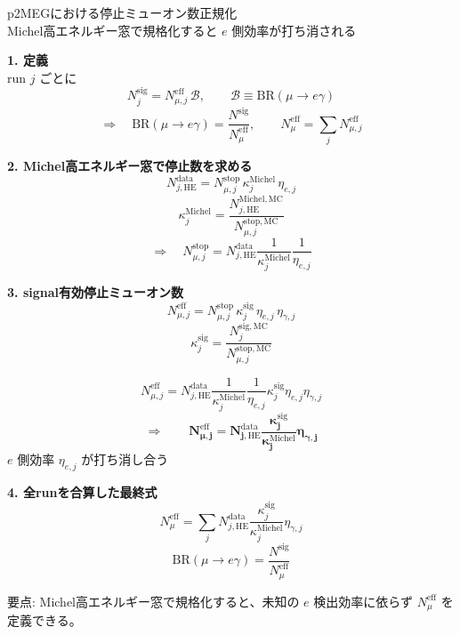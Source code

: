 \documentclass[uplatex,dvipdfmx,12pt]{jsarticle}
\begin{document}
\begin{center}
{\LARGE p2MEGにおける停止ミューオン数正規化}\\[2mm]
{\large Michel高エネルギー窓で規格化すると $e$ 側効率が打ち消される}
\end{center}

\vspace{2mm}

\begin{minipage}[t]{0.47\linewidth}
\large
\textbf{1. 定義}\\[1mm]
run $j$ ごとに
\[
N^{\mathrm{sig}}_j = N^{\mathrm{eff}}_{\mu,j}\,\mathcal{B},
\qquad
\mathcal{B}\equiv \mathrm{BR}(\mu\to e\gamma)
\]
\[
\Rightarrow\quad
\mathrm{BR}(\mu\to e\gamma)=\frac{N^{\mathrm{sig}}}{N^{\mathrm{eff}}_\mu},
\qquad
N^{\mathrm{eff}}_\mu=\sum_j N^{\mathrm{eff}}_{\mu,j}
\]

\vspace{2mm}
\textbf{2. Michel高エネルギー窓で停止数を求める}\\[1mm]
\[
N^{\mathrm{data}}_{j,\mathrm{HE}}
=
N^{\mathrm{stop}}_{\mu,j}\,
\kappa^{\mathrm{Michel}}_j\,
\eta_{e,j}
\]
\[
\kappa^{\mathrm{Michel}}_j
=
\frac{N^{\mathrm{Michel,MC}}_{j,\mathrm{HE}}}{N^{\mathrm{stop,MC}}_{\mu,j}}
\]
\[
\Rightarrow\quad
N^{\mathrm{stop}}_{\mu,j}
=
N^{\mathrm{data}}_{j,\mathrm{HE}}
\frac{1}{\kappa^{\mathrm{Michel}}_j}
\frac{1}{\eta_{e,j}}
\]
\end{minipage}
\hfill
\begin{minipage}[t]{0.49\linewidth}
\large
\textbf{3. signal有効停止ミューオン数}\\[1mm]
\[
N^{\mathrm{eff}}_{\mu,j}
=
N^{\mathrm{stop}}_{\mu,j}\,
\kappa^{\mathrm{sig}}_j\,
\eta_{e,j}\,
\eta_{\gamma,j}
\]
\[
\kappa^{\mathrm{sig}}_j
=
\frac{N^{\mathrm{sig,MC}}_j}{N^{\mathrm{stop,MC}}_{\mu,j}}
\]

\vspace{1mm}
\colorbox{yellow!15}{
\parbox{0.94\linewidth}{
\[
N^{\mathrm{eff}}_{\mu,j}
=
N^{\mathrm{data}}_{j,\mathrm{HE}}
\frac{1}{\kappa^{\mathrm{Michel}}_j}
\frac{1}{\eta_{e,j}}
\kappa^{\mathrm{sig}}_j
\eta_{e,j}
\eta_{\gamma,j}
\]
\[
\Longrightarrow\qquad
\bm{
N^{\mathrm{eff}}_{\mu,j}
=
N^{\mathrm{data}}_{j,\mathrm{HE}}
\frac{\kappa^{\mathrm{sig}}_j}{\kappa^{\mathrm{Michel}}_j}
\eta_{\gamma,j}
}
\]
\centering
\large $e$ 側効率 $\eta_{e,j}$ が打ち消し合う
}}

\vspace{4mm}
\textbf{4. 全runを合算した最終式}\\[1mm]
\[
\boxed{
N^{\mathrm{eff}}_\mu
=
\sum_j
N^{\mathrm{data}}_{j,\mathrm{HE}}
\frac{\kappa^{\mathrm{sig}}_j}{\kappa^{\mathrm{Michel}}_j}
\eta_{\gamma,j}
}
\]
\[
\boxed{
\mathrm{BR}(\mu\to e\gamma)=\frac{N^{\mathrm{sig}}}{N^{\mathrm{eff}}_\mu}
}
\]
\end{minipage}

\vfill
\begin{flushright}
\large
要点: Michel高エネルギー窓で規格化すると、未知の $e$ 検出効率に依らず
$N^{\mathrm{eff}}_\mu$ を定義できる。
\end{flushright}
\end{document}
